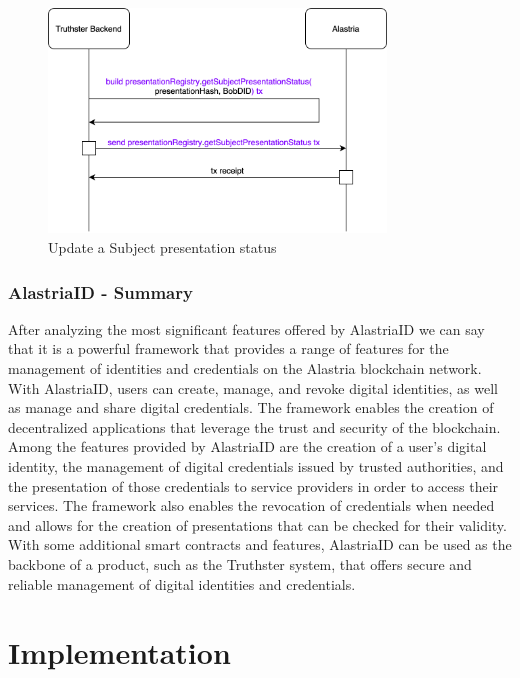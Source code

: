 \documentclass[target=mst,aauheader=]{thud}
\begin{document}
\begin{figure}
    \centering
    \includegraphics[width=0.8\textwidth]{images/checkSubjectPresentationStatus.png}
    \caption{Update a Subject presentation status}
    \label{fig:checkSubjectPresentationStatus}
\end{figure}

\subsection{AlastriaID - Summary}

After analyzing the most significant features offered by AlastriaID we can say that it is a powerful framework that provides a range of features for the management of identities and credentials on the Alastria blockchain network. With AlastriaID, users can create, manage, and revoke digital identities, as well as manage and share digital credentials. The framework enables the creation of decentralized applications that leverage the trust and security of the blockchain. Among the features provided by AlastriaID are the creation of a user's digital identity, the management of digital credentials issued by trusted authorities, and the presentation of those credentials to service providers in order to access their services. The framework also enables the revocation of credentials when needed and allows for the creation of presentations that can be checked for their validity. With some additional smart contracts and features, AlastriaID can be used as the backbone of a product, such as the Truthster system, that offers secure and reliable management of digital identities and credentials.




\chapter{Implementation}
\label{chapter:implementation}
\end{document}
